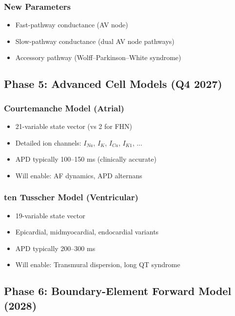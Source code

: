 \documentclass[11pt, a4paper]{article}
\begin{document}
\subsubsection{New Parameters}
\begin{itemize}
    \item Fast-pathway conductance (AV node)
    \item Slow-pathway conductance (dual AV node pathways)
    \item Accessory pathway (Wolff--Parkinson--White syndrome)
\end{itemize}

\subsection{Phase 5: Advanced Cell Models (Q4 2027)}

\subsubsection{Courtemanche Model (Atrial)}
\begin{itemize}
    \item 21-variable state vector (vs 2 for FHN)
    \item Detailed ion channels: $I_{Na}$, $I_K$, $I_{Ca}$, $I_{K1}$, ...
    \item APD typically 100--150 ms (clinically accurate)
    \item Will enable: AF dynamics, APD alternans
\end{itemize}

\subsubsection{ten Tusscher Model (Ventricular)}
\begin{itemize}
    \item 19-variable state vector
    \item Epicardial, midmyocardial, endocardial variants
    \item APD typically 200--300 ms
    \item Will enable: Transmural dispersion, long QT syndrome
\end{itemize}

\subsection{Phase 6: Boundary-Element Forward Model (2028)}
\end{document}
